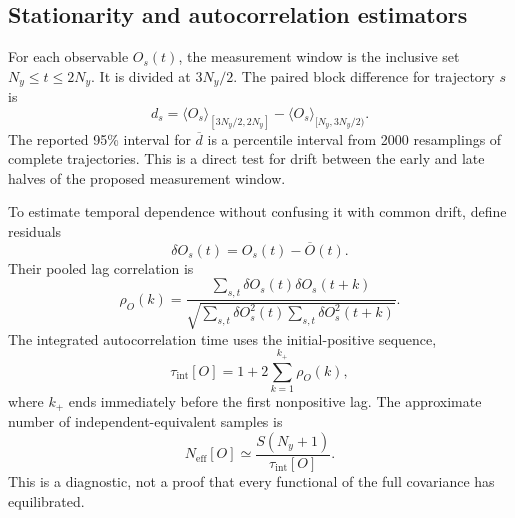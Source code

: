 \documentclass[aps,prb,twocolumn,nofootinbib,superscriptaddress,floatfix]{revtex4-2}
\newcommand{\Tint}{\tau_{\mathrm{int}}}
\begin{document}
\subsection{Stationarity and autocorrelation estimators}

For each observable $O_s(t)$, the measurement window is the inclusive set
$N_y\le t\le2N_y$.  It is divided at $3N_y/2$.  The paired block difference
for trajectory $s$ is
\begin{equation}
 d_s=\langle O_s\rangle_{[3N_y/2,2N_y]}
 -\langle O_s\rangle_{[N_y,3N_y/2)}.
 \label{eq:blockdifference}
\end{equation}
The reported 95\% interval for $\overline d$ is a percentile interval from
2000 resamplings of complete trajectories.  This is a direct test for drift
between the early and late halves of the proposed measurement window.

To estimate temporal dependence without confusing it with common drift, define
residuals
\begin{equation}
 \delta O_s(t)=O_s(t)-\overline O(t).
\end{equation}
Their pooled lag correlation is
\begin{equation}
 \rho_O(k)=
 \frac{\sum_{s,t}\delta O_s(t)\delta O_s(t+k)}
 {\sqrt{\sum_{s,t}\delta O_s^2(t)
 \sum_{s,t}\delta O_s^2(t+k)}}.
 \label{eq:acf}
\end{equation}
The integrated autocorrelation time uses the initial-positive sequence,
\begin{equation}
 \Tint[O]=1+2\sum_{k=1}^{k_+}\rho_O(k),
 \label{eq:tauint}
\end{equation}
where $k_+$ ends immediately before the first nonpositive lag.  The approximate
number of independent-equivalent samples is
\begin{equation}
 N_{\mathrm{eff}}[O]\simeq
 \frac{S(N_y+1)}{\Tint[O]}.
 \label{eq:neff}
\end{equation}
This is a diagnostic, not a proof that every functional of the full covariance
has equilibrated.
\end{document}
